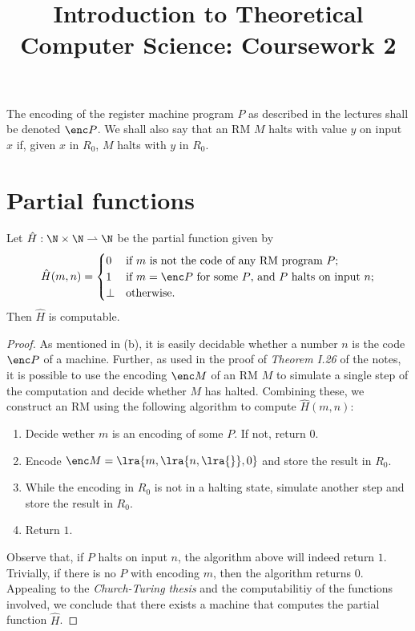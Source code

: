 \documentclass{article}
\title{Introduction to Theoretical Computer Science: Coursework 2}
\author{}
\begin{document}
\maketitle
\noindent The encoding of the register machine program $P$ as described in the lectures shall be denoted $\enc P$.
We shall also say that an RM $M$ halts with value $y$ on input $x$ if, given $x$ in $R_0$, $M$ halts
with $y$ in $R_0$.
\section{Partial functions}
\begin{claim*}[a, 1]
	Let $\hat H:\N\times\N\rightharpoonup\N$ be the partial function given by
	\begin{align*}
		\hat H(m,n)=\begin{cases}
			            0    & \text{if $m$ is not the code of any RM program $P$;}           \\
			            1    & \text{if $m=\enc P$ for some $P$, and $P$ halts on input $n$;} \\
			            \bot & \text{otherwise}.
		            \end{cases}
	\end{align*}
	Then $\hat H$ is computable.
	\begin{proof}
		As mentioned in (b), it is easily decidable whether a number $n$ is the code $\enc P$ of a
		machine. Further, as used in the proof of \emph{Theorem I.26} of the notes, it is possible
		to use the encoding $\enc M$ of an RM $M$ to simulate a single step of the computation and decide whether
		$M$ has halted. Combining these, we construct an RM using the following algorithm to compute
		$\hat H(m,n)$:
		\begin{enumerate}
			\item Decide wether $m$ is an encoding of some $P$. If not, return $0$.
			\item Encode $\enc M=\lra{m, \lra{n, \lra{}}, 0}$ and store the result in $R_0$.
			\item While the encoding in $R_0$ is not in a halting state, simulate another step and store the result in $R_0$.
			\item Return $1$.
		\end{enumerate}
		Observe that, if $P$ halts on input $n$, the algorithm above will indeed return $1$. Trivially,
		if there is no $P$ with encoding $m$, then the algorithm returns $0$.
		Appealing to the \emph{Church-Turing thesis} and the computabilitiy of the functions involved,
		we conclude that there exists a machine that computes the partial function $\hat H$.
	\end{proof}
\end{claim*}
\end{document}
